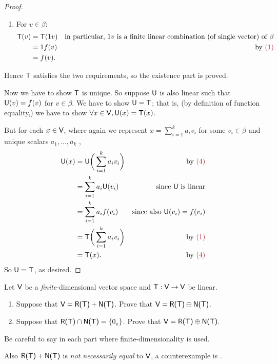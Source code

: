 \begin{proof}
\begin{enumerate}
\item
For \(v \in \beta\):
\begin{align*}
    \T(v) & = \T(1 v) & \text{in particular, \(1v\) is a finite linear combination (of single vector) of \(\beta\)} \\
            & = 1 f(v) & \text{by \MAROON{(1)}} \\
            & = f(v).
\end{align*}
\end{enumerate}
Hence \(\textsf{T}\) satisfies the two requirements, so the existence part is proved.

Now we have to show \(\textsf{T}\) is unique.
So suppose \(\textsf{U}\) is also linear such that \(\textsf{U}(v) = f(v)\) for \(v \in \beta\).
We have to show \(\textsf{U} = \textsf{T}\);
that is, (by definition of function equality,) we have to show \(\forall x \in \textsf{V}, \textsf{U}(x) = \textsf{T}(x)\).

But for each \(x \in \textsf{V}\), where again we represent \(x = \sum_{i = 1}^k a_i v_i\) for some \(v_i \in \beta\) and unique scalars \(a_1, ..., a_k\) ,
\begin{align*}
    \U(x) & = \U\bigg(\sum_{i = 1}^k a_i v_i\bigg) & \text{by \MAROON{(4)}}\\
           & = \sum_{i = 1}^k a_i \U(v_i) & \text{since \(\U\) is linear} \\
           & = \sum_{i = 1}^k a_i f(v_i) & \text{since also \(\U(v_i) = f(v_i)\)} \\
           & = \T\bigg(\sum_{i = 1}^k a_i v_i\bigg) & \text{by \MAROON{(1)}} \\
           & = \T(x). & \text{by \MAROON{(4)}}
\end{align*}
So \(\textsf{U} = \textsf{T}\), as desired.
\end{proof}

\begin{exercise} \label{exercise 2.1.36}
Let \(\textsf{V}\) be a \emph{finite}-dimensional vector space and \(\textsf{T} : \textsf{V} \to \textsf{V}\) be linear.
\begin{enumerate}
\item Suppose that \(\textsf{V} = \textsf{R(T)} + \textsf{N(T)}\).
    Prove that \(\textsf{V} = \textsf{R(T)} \oplus \textsf{N(T)}\).
\item Suppose that \(\textsf{R(T)} \cap \textsf{N(T)} = \{ 0_{_{\textsf{V}}} \}\).
    Prove that \(\textsf{V} = \textsf{R(T)} \oplus \textsf{N(T)}\).
\end{enumerate}

Be careful to say in each part where finite-dimensionality is used.

Also  \(\textsf{R(T)} + \textsf{N(T)}\) is \emph{not necessarily equal} to \(\textsf{V}\), a counterexample is .
\end{exercise}

